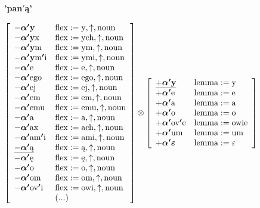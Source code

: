\documentclass{article}
\begin{document}
\begin{figure}
	\textbf{'pan$'$ą'}
\begin{scriptsize}\[
\left[\begin{array}{ll}
-\text{\boldmath$\alpha'${\bf y}} & \text{flex}:=\text{y}, \uparrow, \text{noun}\\
-\text{\boldmath$\alpha'${\bf y}x} & \text{flex}:=\text{ych}, \uparrow, \text{noun}\\
-\text{\boldmath$\alpha'${\bf y}m} & \text{flex}:=\text{ym}, \uparrow, \text{noun}\\
-\text{\boldmath$\alpha'${\bf y}m$'$i} & \text{flex}:=\text{ymi}, \uparrow, \text{noun}\\
-\text{\boldmath$\alpha'$e} & \text{flex}:=\text{e}, \uparrow, \text{noun}\\
-\text{\boldmath$\alpha'$ego} & \text{flex}:=\text{ego}, \uparrow, \text{noun}\\
-\text{\boldmath$\alpha'$ej} & \text{flex}:=\text{ej}, \uparrow, \text{noun}\\
-\text{\boldmath$\alpha'$em} & \text{flex}:=\text{em}, \uparrow, \text{noun}\\
-\text{\boldmath$\alpha'$emu} & \text{flex}:=\text{emu}, \uparrow, \text{noun}\\
-\text{\boldmath$\alpha'$a} & \text{flex}:=\text{a}, \uparrow, \text{noun}\\
-\text{\boldmath$\alpha'$ax} & \text{flex}:=\text{ach}, \uparrow, \text{noun}\\
-\text{\boldmath$\alpha'$am$'$i} & \text{flex}:=\text{ami}, \uparrow, \text{noun}\\
	\underline{-\text{\boldmath$\alpha'$ą}} & \text{flex}:=\text{ą}, \uparrow, \text{noun}\\
-\text{\boldmath$\alpha'$ę} & \text{flex}:=\text{ę}, \uparrow, \text{noun}\\
-\text{\boldmath$\alpha'$o} & \text{flex}:=\text{o}, \uparrow, \text{noun}\\
-\text{\boldmath$\alpha'$om} & \text{flex}:=\text{om}, \uparrow, \text{noun}\\
-\text{\boldmath$\alpha'$ov$'$i} & \text{flex}:=\text{owi}, \uparrow, \text{noun}\\
	& (...)  
\end{array}\right] \otimes \left[\begin{array}{ll}
\underline{+\text{\boldmath$\alpha'${\bf y}}} & \text{lemma}:=\text{y}\\
+\text{\boldmath$\alpha'$e} & \text{lemma}:=\text{e}\\
+\text{\boldmath$\alpha'$a} & \text{lemma}:=\text{a}\\
+\text{\boldmath$\alpha'$o} & \text{lemma}:=\text{o}\\
+\text{\boldmath$\alpha'$ov$'$e} & \text{lemma}:=\text{owie}\\
+\text{\boldmath$\alpha'$um} & \text{lemma}:=\text{um}\\
+\text{\boldmath$\alpha'\varepsilon$} & \text{lemma}:=\text{$\varepsilon$}
\end{array}\right]
\]\end{scriptsize}


\end{figure}
\end{document}
